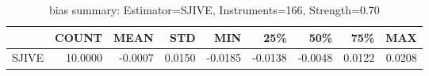 \begin{table}[ht]
\centering
\caption{bias summary: Estimator=SJIVE, Instruments=166, Strength=0.70}
\begin{tabular}{lrrrrrrrr}
\toprule
 & COUNT & MEAN & STD & MIN & 25\% & 50\% & 75\% & MAX \\
\midrule
SJIVE & 10.0000 & -0.0007 & 0.0150 & -0.0185 & -0.0138 & -0.0048 & 0.0122 & 0.0208 \\
\bottomrule
\end{tabular}
\end{table}
